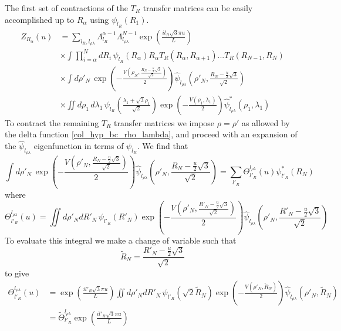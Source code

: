 %
The first set of contractions of the $T_{R}$ transfer matrices can be easily accomplished up to $R_{\alpha}$ using $\psi_{l_R}\left(R_{1}\right)$. 
%
\begin{align}
\label{col_mxd_r_3}
Z_{R_{\alpha}}\left(u\right)&=\sum_{l_R,l_{\rho\lambda}}\Lambda_{l_{R}}^{\alpha-1}\Lambda_{l_{\rho\lambda}}^{N-1}\exp\left(\frac{il_{R}\sqrt{3}\pi u}{L}\right)\nonumber\\
&\times\int\prod^{N}_{i=\alpha}dR_i\,\psi_{l_R}\left(R_{\alpha}\right)R_{\alpha}T_{R}(R_{\alpha},R_{\alpha+1})...T_{R}(R_{N-1},R_{N})\nonumber\\
&\times\int d\rho'_N\,\exp\left(-\frac{V\left(\rho_{N},\frac{R_N-\frac{u}{2}\sqrt{3}}{\sqrt{2}}\right)}{2}\right)\hat{\psi}_{l_{\rho\lambda}}\left(\rho'_{N},\frac{R_N-\frac{u}{2}\sqrt{3}}{\sqrt{2}}\right)\nonumber\\
&\times\iint d\rho_1\,d\lambda_1\,\psi_{l_R}\left(\frac{\lambda_1 + \sqrt{3}\rho_1}{\sqrt{2}}\right)\exp\left(-\frac{V\left(\rho_{1},\lambda_{1}\right)}{2}\right)\hat{\psi}^{*}_{l_{\rho\lambda}}\left(\rho_{1},\lambda_{1}\right)
\end{align}
%
To contract the remaining $T_{R}$ transfer matrices we impose $\rho=\rho'$ as allowed by the delta function \eqref{col_hyp_bc_rho_lambda}, and proceed with an expansion of the $\hat{\psi}_{l_{\rho\lambda}}$ eigenfunction in terms of $\psi_{l_{R}}$. We find that
%
\begin{equation}
\label{expand_theta}
\int d\rho'_N\,\exp\left(-\frac{V\left(\rho'_{N},\frac{R_N-\frac{u}{2}\sqrt{3}}{\sqrt{2}}\right)}{2}\right)\hat{\psi}_{l_{\rho\lambda}}\left(\rho'_{N},\frac{R_N-\frac{u}{2}\sqrt{3}}{\sqrt{2}}\right) = \sum_{l'_{R}}\Theta_{l'_{R}}^{l_{\rho\lambda}}(u)\psi_{l'_R}^{*}\left(R_{N}\right)
\end{equation}
%
where
%
\begin{equation}
\Theta_{l'_{R}}^{l_{\rho\lambda}}(u) = \iint d\rho'_{N}dR'_{N}\,\psi_{l'_R}\left(R'_{N}\right)\exp\left(-\frac{V\left(\rho'_{N},\frac{R'_N-\frac{u}{2}\sqrt{3}}{\sqrt{2}}\right)}{2}\right)\hat{\psi}_{l_{\rho\lambda}}\left(\rho'_{N},\frac{R'_N-\frac{u}{2}\sqrt{3}}{\sqrt{2}}\right)
\end{equation}
%
To evaluate this integral we make a change of variable such that
%
\begin{equation}\label{variable_change2}
\tilde{R}_{N}=\frac{R'_N-\frac{u}{2}\sqrt{3}}{\sqrt{2}}
\end{equation}
%
to give
%
\begin{align}
\label{expand_theta2}
\Theta_{l'_{R}}^{l_{\rho\lambda}}(u) &= \exp\left(\frac{il'_{R}\sqrt{3}\pi u}{L}\right)\iint d\rho'_{N}dR'_{N}\,\psi_{l'_R}\left(\sqrt{2}\tilde{R}_{N}\right)\exp\left(-\frac{V\left(\rho'_{N},\tilde{R}_{N}\right)}{2}\right)\hat{\psi}_{l_{\rho\lambda}}\left(\rho'_{N},\tilde{R}_{N}\right)\nonumber\\
&=\tilde{\Theta}_{l'_{R}}^{l_{\rho\lambda}}\exp\left(\frac{il'_{R}\sqrt{3}\pi u}{L}\right)
\end{align}
